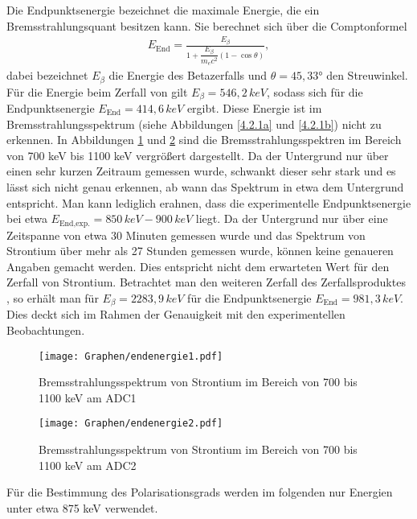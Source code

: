 \documentclass[twoside,colorback,accentcolor=tud4c,11pt]{tudreport}
\begin{document}
Die Endpunktsenergie bezeichnet die maximale Energie, die ein Bremsstrahlungsquant besitzen kann. Sie berechnet sich über die Comptonformel
\begin{align*}
E_{\text{End}}=\frac{E_{\beta}}{1+\dfrac{E_{\beta}}{m_ec^2}\left(1-\cos{\theta}\right)},
\end{align*}
dabei bezeichnet $E_{\beta}$ die Energie des Betazerfalls und $\theta=45,33$° den Streuwinkel. Für die Energie beim Zerfall von  gilt $E_{\beta}=546,2\,\si{keV}$, sodass sich für die Endpunktsenergie $E_{\text{End}}=414,6\,\si{keV}$ ergibt. Diese Energie ist im Bremsstrahlungsspektrum (siehe Abbildungen \ref{4.2.1a} und \ref{4.2.1b}) nicht zu erkennen. In Abbildungen \ref{4.2.1c} und \ref{4.2.1d} sind die Bremsstrahlungsspektren im Bereich von 700 keV bis 1100 keV vergrößert dargestellt. Da der Untergrund nur über einen sehr kurzen Zeitraum gemessen wurde, schwankt dieser sehr stark und es lässt sich nicht genau erkennen, ab wann das Spektrum in etwa dem Untergrund entspricht. Man kann lediglich erahnen, dass die experimentelle Endpunktsenergie bei etwa $E_{\text{End,exp.}}=850\,\si{keV} - 900\,\si{keV}$ liegt. Da der Untergrund nur über eine Zeitspanne von etwa 30 Minuten gemessen wurde und das Spektrum von Strontium über mehr als 27 Stunden gemessen wurde, können keine genaueren Angaben gemacht werden. Dies entspricht nicht dem erwarteten Wert für den Zerfall von Strontium. Betrachtet man den weiteren Zerfall des Zerfallsproduktes , so erhält man für $E_{\beta}=2283,9\,\si{keV}$ für die Endpunktsenergie  $E_{\text{End}}=981,3\,\si{keV}$. Dies deckt sich im Rahmen der Genauigkeit mit den experimentellen Beobachtungen. 
\begin{figure}[H]
\centering
   	\begin{minipage}[b]{1\textwidth}
   	\texttt{[image: Graphen/endenergie1.pdf]}
   	\caption{Bremsstrahlungsspektrum von Strontium im Bereich von 700 bis 1100 keV am ADC1}
  	\label{4.2.1c}
   	\end{minipage}
\end{figure}  
\begin{figure}[H]
\centering
   	\begin{minipage}[b]{1\textwidth}
   	\texttt{[image: Graphen/endenergie2.pdf]}
   	\caption{Bremsstrahlungsspektrum von Strontium im Bereich von 700 bis 1100 keV am ADC2}
  	\label{4.2.1d}
   	\end{minipage}
\end{figure}
Für die Bestimmung des Polarisationsgrads werden im folgenden nur Energien unter etwa 875 keV verwendet.
\end{document}
